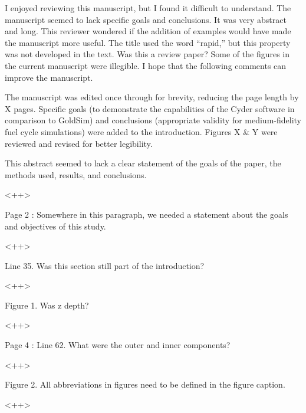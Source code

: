 \documentclass[answers,12pt]{exam}
\begin{document}
\begin{questions}
\question I enjoyed reviewing this manuscript, but I found it difficult to understand.
The manuscript seemed to lack specific goals and conclusions. It was very
abstract and long.  This reviewer wondered if the addition of examples would
have made the manuscript more useful. The title used the word “rapid,” but this
property was not developed in the text. Was this a review paper? Some of the
figures in the current manuscript were illegible. I hope that the following
comments can improve the manuscript.
\begin{solution}
The manuscript was edited once through for brevity, reducing the page length by
X pages. Specific goals (to demonstrate the capabilities of the Cyder software
in comparison to GoldSim) and conclusions (appropriate validity for
medium-fidelity fuel cycle simulations) were added to the introduction. Figures
X \& Y were reviewed and revised for better legibility.
\end{solution}

\question This abstract seemed to lack a clear statement of the goals of the paper, the methods used, results, and conclusions.
\begin{solution}
<++>
\end{solution}

\question Page 2 : Somewhere in this paragraph, we needed a statement about the goals and objectives of this study.
\begin{solution}
<++>
\end{solution}


\question Line 35. Was this section still part of the introduction?

\begin{solution}
<++>
\end{solution}

\question Figure 1. Was z depth?
\begin{solution}
<++>
\end{solution}

\question Page 4 : Line 62. What were the outer and inner components?

\begin{solution}
<++>
\end{solution}
 

\question Figure 2. All abbreviations in figures need to be defined in the figure caption.
\begin{solution}
<++>
\end{solution}
 


\end{questions}
\end{document}
